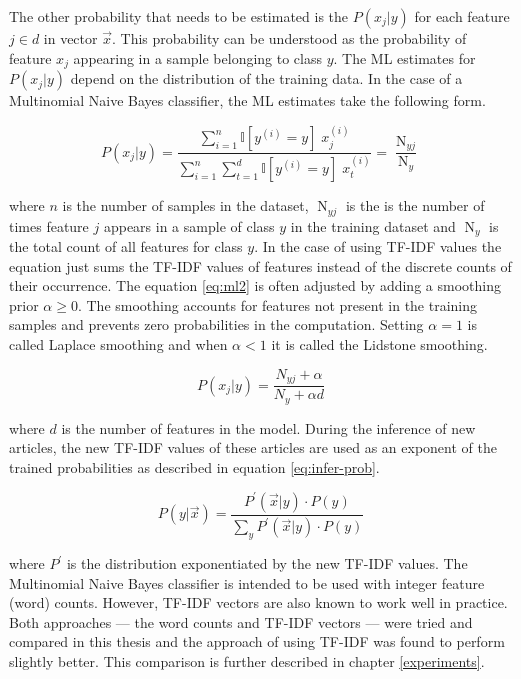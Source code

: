The other probability that needs to be estimated is the $P(x_j|y)$ for each feature $j \in d$ in vector $\Vec{x}$. This probability can be understood as the probability of feature $x_j$ appearing in a sample belonging to class $y$. The ML estimates for $P(x_j|y)$ depend on the distribution of the training data. In the case of a Multinomial Naive Bayes classifier, the ML estimates take the following form.

\begin{equation}
    P(x_j|y) = \displaystyle{\frac{\sum_{i=1}^n \mathbb{I}[y^{(i)} = y] \; x_j^{(i)}}{\sum_{i=1}^n \sum_{t=1}^d \mathbb{I}[y^{(i)} = y] \; x_t^{(i)}} = \frac{\operatorname{N}_{yj}}{\operatorname{N}_y}}
    \label{eq:ml2}
\end{equation}

where $n$ is the number of samples in the dataset, $\operatorname{N}_{yj}$ is the is the number of times feature $j$ appears in a sample of class $y$ in the training dataset and $\operatorname{N}_y$ is the total count of all features for class $y$. In the case of using TF-IDF values the equation just sums the TF-IDF values of features instead of the discrete counts of their occurrence. The equation \ref{eq:ml2} is often adjusted by adding a smoothing prior $\alpha \geq 0$. The smoothing accounts for features not present in the training samples and prevents zero probabilities in the computation. Setting $\alpha = 1$ is called Laplace smoothing and when $\alpha < 1$ it is called the Lidstone smoothing. 

\begin{equation}
    P(x_j|y) = \displaystyle{\frac{N_{yj} + \alpha}{N_y + \alpha d}}
    \label{eq:ml_estimates}
\end{equation}

where $d$ is the number of features in the model. During the inference of new articles, the new TF-IDF values of these articles are used as an exponent of the trained probabilities as described in equation \ref{eq:infer-prob}.

\begin{equation}
    P(y|\Vec{x}) = \displaystyle{\frac{P^{'}(\Vec{x}|y) \cdot P(y)}{\sum_y{P^{'}(\Vec{x}|y) \cdot P(y)}}}
    \label{eq:infer-prob}
\end{equation}

where $P^{'}$ is the distribution exponentiated by the new TF-IDF values. The Multinomial Naive Bayes classifier is intended to be used with integer feature (word) counts. However, TF-IDF vectors are also known to work well in practice. Both approaches --- the word counts and TF-IDF vectors --- were tried and compared in this thesis and the approach of using TF-IDF was found to perform slightly better. This comparison is further described in chapter \ref{experiments}. 

